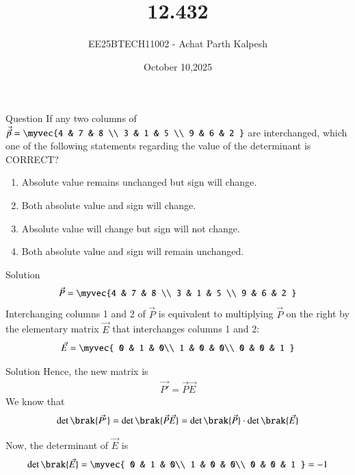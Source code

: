 \documentclass{beamer}
\title %
{12.432}
\date{October 10,2025}
\author %
{EE25BTECH11002 - Achat Parth Kalpesh}
\begin{document}
\frame{\titlepage}

\begin{frame}{Question}
If any two columns of 
$\Vec{\vec{p}} = \myvec{4 & 7 & 8 \\
                  3 & 1 & 5 \\
                  9 & 6 & 2 }$
are interchanged, which one of the following statements regarding the value of the determinant is CORRECT?
\begin{enumerate}
\item Absolute value remains unchanged but sign will change.  
\item Both absolute value and sign will change.  
\item Absolute value will change but sign will not change.  
\item Both absolute value and sign will remain unchanged.  
\end{enumerate}
\end{frame}

\begin{frame}{Solution}
\begin{align}
    \Vec{{P}} =  \myvec{4 & 7 & 8 \\
                  3 & 1 & 5 \\
                  9 & 6 & 2 }
\end{align}
Interchanging columns 1 and 2 of $\vec{P}$ is equivalent to multiplying $\vec{P}$ on the right by the elementary matrix $\vec{E}$ that interchanges columns 1 and 2:
\begin{align}
\vec{E} = \myvec{
0 & 1 & 0\\
1 & 0 & 0\\
0 & 0 & 1
}
\end{align}
\end{frame}



\begin{frame}{Solution}
Hence, the new matrix is
\begin{align}
\vec{P'} = \vec{P}\vec{E}
\end{align}
We know that
\begin{align}
\det\brak{\vec{P'}} = \det\brak{\vec{P}\vec{E}} = \det\brak{\vec{P}} \cdot \det\brak{\vec{E}}
\end{align}

Now, the determinant of $\vec{E}$ is
\begin{align}
\det\brak{\vec{E}} 
= 
\myvec{
0 & 1 & 0\\
1 & 0 & 0\\
0 & 0 & 1
}
= -1
\end{align}
\end{frame}
\end{document}

